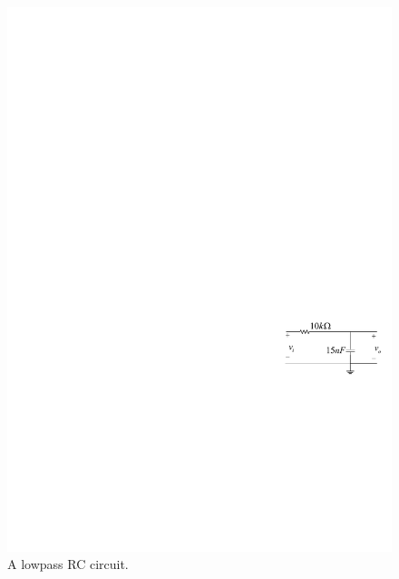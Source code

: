 \documentclass[11pt]{article}
\begin{document}
\begin{question}


    \begin{figure}[H]
        \centering
        \includegraphics[scale=1.2,angle=0]{Fig/cir2.pdf}
        \caption{A lowpass RC circuit.} \label{fig:cir2}
    \end{figure}


\end{question}
\end{document}
